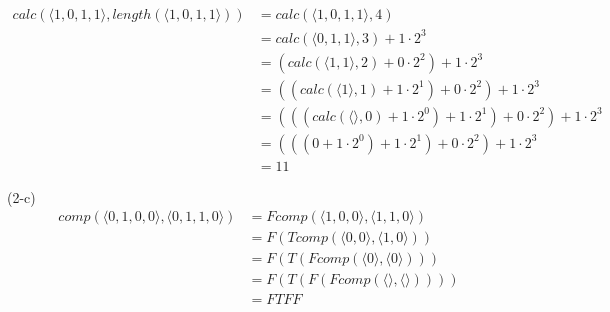 \documentclass[12pt]{article}
\begin{document}
\begin{equation}
\begin{split}
    calc(\langle 1, 0, 1, 1 \rangle, length(\langle 1, 0, 1, 1 \rangle))
    & = calc(\langle 1, 0, 1, 1 \rangle, 4) \\
    & = calc(\langle 0, 1, 1 \rangle, 3) + 1 \cdot 2^3 \\
    & = (calc(\langle 1, 1 \rangle, 2) + 0 \cdot 2^2)  + 1 \cdot 2^3 \\
    & = ((calc(\langle 1 \rangle, 1) + 1 \cdot 2^1) + 0 \cdot 2^2)  + 1 \cdot 2^3 \\
    & = (((calc(\langle \rangle, 0) + 1 \cdot 2^0) + 1 \cdot 2^1) + 0 \cdot 2^2)  + 1 \cdot 2^3 \\
    & = (((0 + 1 \cdot 2^0) + 1 \cdot 2^1) + 0 \cdot 2^2)  + 1 \cdot 2^3 \\
    & = 11
\end{split}
\end{equation}

(2-c)
\begin{equation}
\begin{split}
    comp(\langle 0, 1, 0, 0 \rangle, \langle 0, 1, 1, 0 \rangle)
    &= Fcomp(\langle 1, 0, 0 \rangle, \langle 1, 1, 0 \rangle) \\
    &= F(Tcomp(\langle 0, 0 \rangle, \langle 1, 0 \rangle)) \\
    &= F(T(Fcomp(\langle 0 \rangle, \langle 0 \rangle))) \\
    &= F(T(F(Fcomp(\langle \rangle, \langle \rangle)))) \\
    &= FTFF
\end{split}
\end{equation}
\end{document}
